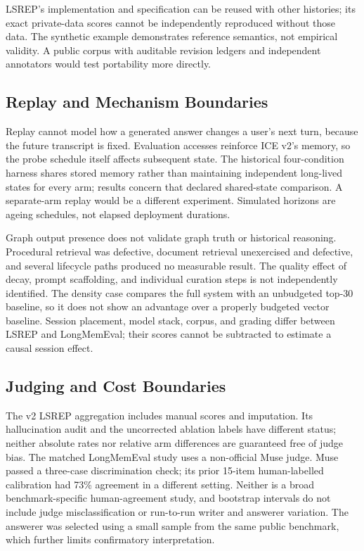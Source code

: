 \documentclass[twoside,11pt]{article}
\begin{document}
LSREP's implementation and specification can be reused with other histories; its exact private-data scores cannot be independently reproduced without those data. The synthetic example demonstrates reference semantics, not empirical validity. A public corpus with auditable revision ledgers and independent annotators would test portability more directly.

\subsection{Replay and Mechanism Boundaries}
Replay cannot model how a generated answer changes a user's next turn, because the future transcript is fixed. Evaluation accesses reinforce ICE v2's memory, so the probe schedule itself affects subsequent state. The historical four-condition harness shares stored memory rather than maintaining independent long-lived states for every arm; results concern that declared shared-state comparison. A separate-arm replay would be a different experiment. Simulated horizons are ageing schedules, not elapsed deployment durations.

Graph output presence does not validate graph truth or historical reasoning. Procedural retrieval was defective, document retrieval unexercised and defective, and several lifecycle paths produced no measurable result. The quality effect of decay, prompt scaffolding, and individual curation steps is not independently identified. The density case compares the full system with an unbudgeted top-30 baseline, so it does not show an advantage over a properly budgeted vector baseline. Session placement, model stack, corpus, and grading differ between LSREP and LongMemEval; their scores cannot be subtracted to estimate a causal session effect.

\subsection{Judging and Cost Boundaries}
The v2 LSREP aggregation includes manual scores and imputation. Its hallucination audit and the uncorrected ablation labels have different status; neither absolute rates nor relative arm differences are guaranteed free of judge bias. The matched LongMemEval study uses a non-official Muse judge. Muse passed a three-case discrimination check; its prior 15-item human-labelled calibration had 73\% agreement in a different setting. Neither is a broad benchmark-specific human-agreement study, and bootstrap intervals do not include judge misclassification or run-to-run writer and answerer variation. The answerer was selected using a small sample from the same public benchmark, which further limits confirmatory interpretation.
\end{document}
